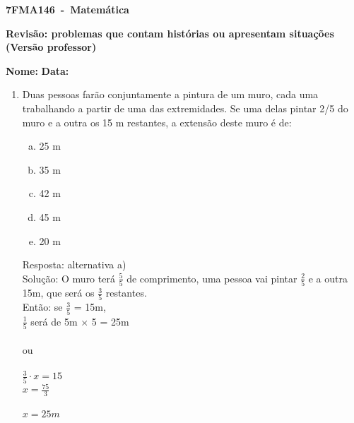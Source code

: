 \documentclass[a4paper,14pt]{article}
\begin{document}
	
	\noindent\textbf{7FMA146~-~Matemática} 
	
	\begin{center}
		\textbf{Revisão: problemas que contam histórias ou apresentam situações (Versão professor)}
	\end{center}
	
	
	\noindent\textbf{Nome:} \underline{\hspace{10cm}}
    \noindent\textbf{Data:} \underline{\hspace{4cm}}
	
	
	\begin{multicols}{2}
	\begin{enumerate}	
		\item Duas pessoas farão conjuntamente a pintura de um muro, cada uma trabalhando a partir de uma das extremidades. Se uma delas pintar 2/5 do muro e a outra os 15 m restantes, a extensão deste muro é de: 
		\begin{enumerate}[a)]
			\item 25 m
			\item 35 m
			\item 42 m
			\item 45 m
			\item 20 m
	    \end{enumerate}
    
        Resposta: alternativa a) \\
        
        Solução: O muro terá $\frac{5}{5}$ de comprimento, uma pessoa vai pintar $\frac{2}{5}$ e a outra 15m, que será os $\frac{3}{5}$ restantes. \\
        Então: se $\frac{3}{5}$ = 15m, \\$\frac{1}{5}$ será de 5m $\times$ 5 = 25m \\\\
        ou \\\\
        $\frac{3}{5} \cdot x = 15$ \\
        $x = \frac{75}{3}$ \\ \\
        $x = 25 m$ \\\\
        

\end{enumerate}
\end{multicols}
\end{document}
